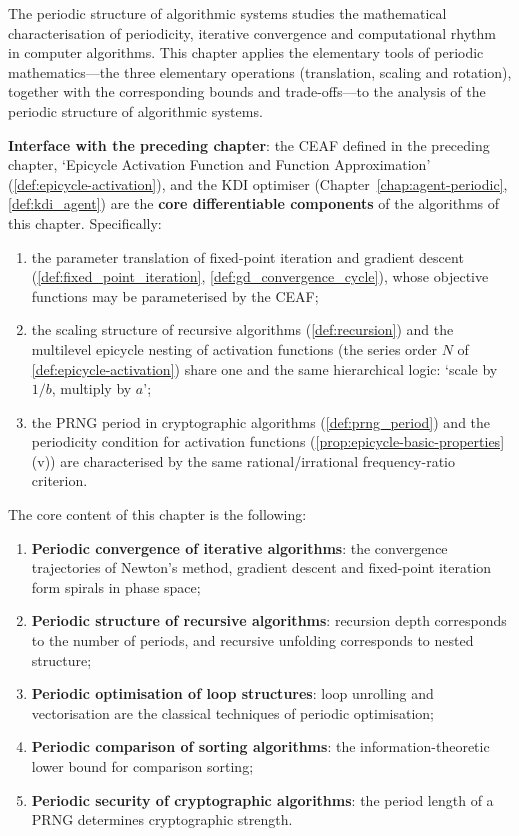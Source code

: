 \begin{definition}\label{def:algorithm_positioning}
The periodic structure of algorithmic systems studies the mathematical characterisation of periodicity, iterative convergence and computational rhythm in computer algorithms. This chapter applies the elementary tools of periodic mathematics---the three elementary operations (translation, scaling and rotation), together with the corresponding bounds and trade-offs---to the analysis of the periodic structure of algorithmic systems.

\textbf{Interface with the preceding chapter}: the CEAF defined in the preceding chapter, `Epicycle Activation Function and Function Approximation' (\cref{def:epicycle-activation}), and the KDI optimiser (Chapter~\ref{chap:agent-periodic}, \cref{def:kdi_agent}) are the \textbf{core differentiable components} of the algorithms of this chapter. Specifically:
\begin{enumerate}[label=(\arabic*)]
    \item the parameter translation of fixed-point iteration and gradient descent (\cref{def:fixed_point_iteration}, \cref{def:gd_convergence_cycle}), whose objective functions may be parameterised by the CEAF;
    \item the scaling structure of recursive algorithms (\cref{def:recursion}) and the multilevel epicycle nesting of activation functions (the series order $N$ of \cref{def:epicycle-activation}) share one and the same hierarchical logic: `scale by $1/b$, multiply by $a$';
    \item the PRNG period in cryptographic algorithms (\cref{def:prng_period}) and the periodicity condition for activation functions (\cref{prop:epicycle-basic-properties}(v)) are characterised by the same rational/irrational frequency-ratio criterion.
\end{enumerate}

The core content of this chapter is the following:
\begin{enumerate}[label=(\arabic*)]
    \item \textbf{Periodic convergence of iterative algorithms}: the convergence trajectories of Newton's method, gradient descent and fixed-point iteration form spirals in phase space;
    \item \textbf{Periodic structure of recursive algorithms}: recursion depth corresponds to the number of periods, and recursive unfolding corresponds to nested structure;
    \item \textbf{Periodic optimisation of loop structures}: loop unrolling and vectorisation are the classical techniques of periodic optimisation;
    \item \textbf{Periodic comparison of sorting algorithms}: the information-theoretic lower bound for comparison sorting;
    \item \textbf{Periodic security of cryptographic algorithms}: the period length of a PRNG determines cryptographic strength.
\end{enumerate}


\end{definition}
